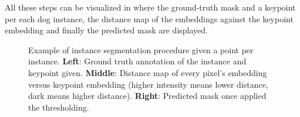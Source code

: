 All these steps can be visualized in  where the ground-truth mask and a keypoint per each dog instance, the distance map of the embeddings against the keypoint embedding and finally the predicted mask are displayed.

\begin{figure}[h]
  \centering
  \caption{Example of instance segmentation procedure given a point per instance.
  \textbf{Left}: Ground truth annotation of the instance and keypoint given.
  \textbf{Middle}: Distance map of every pixel's embedding versus keypoint embedding (higher intensity means lower distance, dark means higher distance).
  \textbf{Right}: Predicted mask once applied the thresholding. }
  \label{fig:instancesegmentation}
\end{figure}
